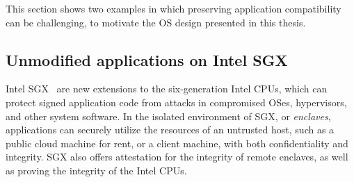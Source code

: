 This section shows two examples in which preserving application compatibility can be challenging, to motivate the OS design presented in this thesis.


\subsection{Unmodified applications on Intel SGX}
\label{sec:intro:sgx}

Intel SGX~\cite{intelsgx} are new extensions to the six-generation Intel CPUs,
which can
protect signed application code from attacks in compromised OSes, hypervisors, and other system software.
In the isolated environment of SGX, or {\em enclaves}, applications can securely utilize the
resources of an untrusted host,
such as a public cloud machine for rent, or a client machine,
with both confidentiality and integrity.
SGX also offers attestation for the integrity of remote enclaves, as well as proving the integrity of the Intel CPUs.



